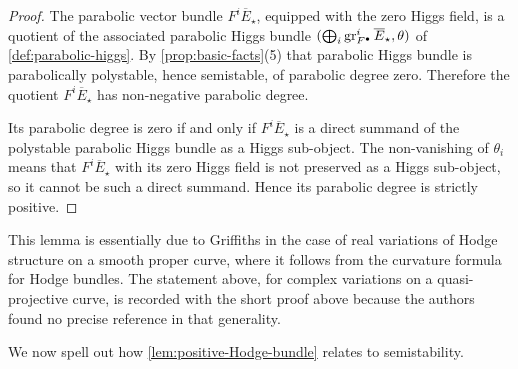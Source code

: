 \begin{proof}
  The parabolic vector bundle \(F^i \overline{E}_\star\), equipped with the zero
  Higgs field, is a quotient of the associated parabolic Higgs bundle
  \((\bigoplus_i \operatorname{gr}^i_{F^\bullet} \overline{E}_\star, \theta)\) of
  \cref{def:parabolic-higgs}. By \cref{prop:basic-facts}(5) that parabolic Higgs
  bundle is parabolically polystable, hence semistable, of parabolic degree zero.
  Therefore the quotient \(F^i \overline{E}_\star\) has non-negative parabolic
  degree.

  Its parabolic degree is zero if and only if \(F^i \overline{E}_\star\) is a
  direct summand of the polystable parabolic Higgs bundle as a Higgs sub-object.
  The non-vanishing of \(\theta_i\) means that \(F^i \overline{E}_\star\) with its
  zero Higgs field is not preserved as a Higgs sub-object, so it cannot be such a
  direct summand. Hence its parabolic degree is strictly positive.
\end{proof}

\begin{remark}
  \label{rem:positive-Hodge-bundle-attribution}
  This lemma is essentially due to Griffiths in the case of real variations of
  Hodge structure on a smooth proper curve, where it follows from the curvature
  formula for Hodge bundles. The statement above, for complex variations on a
  quasi-projective curve, is recorded with the short proof above because the
  authors found no precise reference in that generality.
\end{remark}

We now spell out how \cref{lem:positive-Hodge-bundle} relates to semistability.

